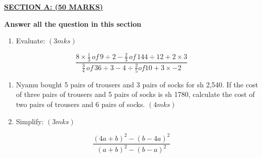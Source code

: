 \documentclass[
  a4paperpaper,
]{scrbook}
\providecommand{\tightlist}{%
  \setlength{\itemsep}{0pt}\setlength{\parskip}{0pt}}\usepackage{longtable,booktabs,array}
\begin{document}
\begin{tcolorbox}[enhanced jigsaw, left=2mm, colframe=quarto-callout-note-color-frame, toptitle=1mm, opacitybacktitle=0.6, rightrule=.15mm, colbacktitle=quarto-callout-note-color!10!white, colback=white, arc=.35mm, breakable, leftrule=.75mm, bottomtitle=1mm, bottomrule=.15mm, title=\textcolor{quarto-callout-note-color}{\faInfo}\hspace{0.5em}{Model Sample Paper 6}, titlerule=0mm, coltitle=black, toprule=.15mm, opacityback=0]

\ul{\textbf{SECTION A: (50 MARKS)}}

\textbf{Answer all the question in this section}

\begin{enumerate}
\def\labelenumi{\arabic{enumi}.}
\tightlist
\item
  Evaluate: \((3mks)\)
\end{enumerate}

\[\frac{8\times \frac{1}{3} \,of \,9\div 2-\frac{2}{3} \,of \,144 \div 12+2\times3}{\frac{3}{4} \,of\, 36 \div 3-4\div \frac{2}{5} of 10+3\times-2}\]

\begin{enumerate}
\def\labelenumi{\arabic{enumi}.}
\setcounter{enumi}{1}
\item
  Nyamu bought 5 pairs of trousers and 3 pairs of socks for sh 2,540. If
  the cost of three pairs of trousers and 5 pairs of socks is sh 1780,
  calculate the cost of two pairs of trousers and 6 pairs of socks.
  \((4mks)\)
\item
  Simplify: \((3mks)\)
\end{enumerate}

\[ \frac{(4a+b)^2-(b-4a)^2}{(a+b)^2-(b-a)^2}\]


\end{tcolorbox}
\end{document}
